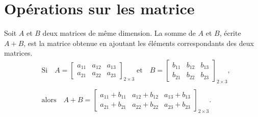 \documentclass[12pt,a4paper]{book}
\numberwithin{definition}{chapter}
\theoremstyle{plain}
\begin{document}
\section{Opérations sur les matrice}
\begin{definition}
 Soit $A$ et $B$ deux matrices de même dimension. La somme de $A$ et $B$, écrite $A+B$, est la matrice obtenue en ajoutant les éléments correspondants des deux matrices.
 \begin{equation*}
 \begin{aligned}
 &\text{Si}\quad A=\begin{bmatrix}
 a_{11} & a_{12} & a_{13}\\
 a_{21} & a_{22}  & a_{23}
 \end{bmatrix}_{2\times 3}\;\text{et}\quad
 B=\begin{bmatrix}
 b_{11} & b_{12} & b_{13}\\
 b_{21} & b_{22}  & b_{23}
 \end{bmatrix}_{2\times 3},
 \\ \ \\
 &\text{alors}\quad A+B=\begin{bmatrix}
 a_{11}+b_{11} & a_{12}+b_{12} & a_{13}+b_{13}\\
 a_{21}+b_{21} & a_{22}+b_{22}  & a_{23}+b_{23}
 \end{bmatrix}_{2\times 3}.
 \end{aligned}
 \end{equation*}
\end{definition}
\end{document}
